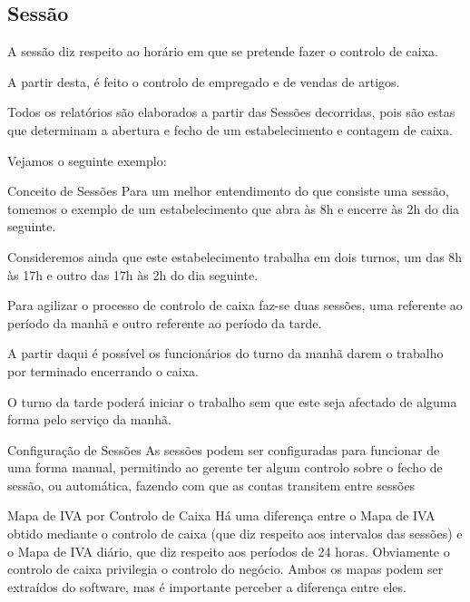 \documentclass[a4paper,11pt,openany]{memoir}
\begin{document}
\subsection{Sessão}

A sessão diz respeito ao horário em que se pretende fazer o controlo de caixa.

A partir desta, é feito o controlo de empregado e de vendas de artigos. 

Todos os relatórios são elaborados a partir das Sessões decorridas, pois são estas 
que determinam a abertura e fecho de um estabelecimento e contagem de caixa.

Vejamos o seguinte exemplo:


\begin{bclogo}[couleur=blue!10,arrondi=0.1,logo=\bccrayon,ombre=true]{Conceito de Sessões}
Para um melhor entendimento do que consiste uma sessão, tomemos o exemplo de um estabelecimento 
que abra às 8h e encerre às 2h do dia seguinte.

Consideremos ainda que este estabelecimento 
trabalha em dois turnos, um das 8h às 17h e outro das 17h às 2h do dia seguinte.

Para agilizar o processo de controlo de caixa faz-se duas sessões, uma referente ao período da manhã e outro 
referente ao período da tarde. 

A partir daqui é possível os funcionários do turno da manhã darem o trabalho por terminado encerrando o caixa. 

O turno da tarde poderá iniciar o trabalho sem que este seja afectado de alguma forma pelo serviço da manhã.
\end{bclogo}

\vspace{5mm}
\begin{bclogo}[couleur=blue!10,arrondi=0.1,logo=\bclampe,ombre=true]{Configuração de Sessões}
As sessões podem ser configuradas para funcionar de uma forma manual, permitindo ao gerente ter algum controlo
sobre o fecho de sessão, ou automática, fazendo com que as contas transitem entre sessões 
\end{bclogo}


\begin{bclogo}[couleur=blue!10,arrondi=0.1,logo=\bctakecare,ombre=true]{Mapa de IVA por Controlo de Caixa}
Há uma diferença entre o Mapa de IVA obtido mediante o controlo de caixa (que diz respeito aos intervalos das
sessões) e o Mapa de IVA diário, que diz respeito aos períodos de 24 horas. Obviamente o controlo de caixa privilegia
o controlo do negócio. Ambos os mapas podem ser extraídos do software, mas é importante perceber a diferença entre eles.
\end{bclogo}
\end{document}

